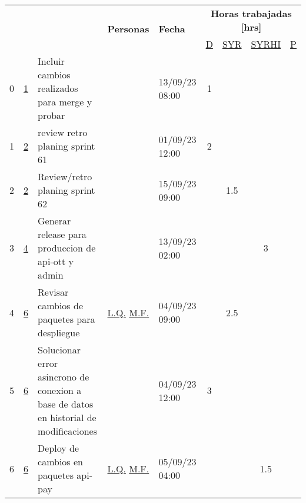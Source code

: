 \documentclass{article}
\begin{document}
\begin{longtable}{|m{0.5cm}|m{1.2cm}|p{5cm}|m{1.5cm}|m{1.5cm}||c|c|c|c||}
        \hline
        \multirow{2}{=}{\centering{\textbf{N°}}} & \multirow{2}{=}{\centering{\textbf{N°Hist}}} & \multirow{2}{=}{\centering{\textbf{Detalle Tarea}}}  & \multirow{2}{=}{\textbf{Personas}} & \multirow{2}{=}{\textbf{Fecha}} &   
        \multicolumn{4}{c|}{
            \textbf{Horas trabajadas [hrs]}
        } \\ 
        \hhline{~~~~~----}
        &&&&&  \hyperref[D]{\color{blue}D}  
&  \hyperref[SYR]{\color{blue}SYR}  
&  \hyperref[SYRHI]{\color{blue}SYRHI}  
&  \hyperref[P]{\color{blue}P}  
\\ \hline \hline
                 \label{0}0  &  \hyperref[1]{\color{blue}1}  & Incluir cambios realizados para merge y probar &  
                 & 13/09/23 08:00  & 1 &  &  & \\ \hline 

                 \label{1}1  &  \hyperref[2]{\color{blue}2}  & 	
review retro planing sprint 61 &  
                 & 01/09/23 12:00  & 2 &  &  & \\ \hline 

                 \label{2}2  &  \hyperref[2]{\color{blue}2}  & Review/retro planing sprint 62 &  
                 & 15/09/23 09:00  &  & 1.5 &  & \\ \hline 

                 \label{3}3  &  \hyperref[4]{\color{blue}4}  & Generar release para produccion de api-ott y admin &  
                 & 13/09/23 02:00  &  &  & 3 & \\ \hline 

                 \label{4}4  &  \hyperref[6]{\color{blue}6}  & Revisar cambios de paquetes para despliegue &  
                  \hyperref[L.Q.]{\color{blue}L.Q.} \newline  \hyperref[M.F.]{\color{blue}M.F.}  & 04/09/23 09:00  &  & 2.5 &  & \\ \hline 

                 \label{5}5  &  \hyperref[6]{\color{blue}6}  & Solucionar error asincrono de conexion a base de datos en historial de modificaciones &  
                 & 04/09/23 12:00  & 3 &  &  & \\ \hline 

                 \label{6}6  &  \hyperref[6]{\color{blue}6}  & Deploy de cambios en paquetes api-pay &  
                  \hyperref[L.Q.]{\color{blue}L.Q.} \newline  \hyperref[M.F.]{\color{blue}M.F.}  & 05/09/23 04:00  &  &  & 1.5 & \\ \hline 


\end{longtable}
\end{document}
